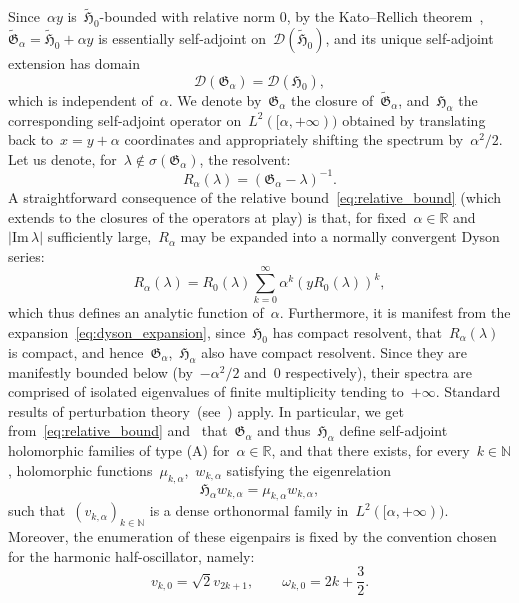 \documentclass[10pt]{article}
\newcommand{\R}{\mathbb{R}}
\newcommand{\N}{\mathbb N}
\newcommand{\1}{\mathbbm 1}
\begin{document}
    Since~$\alpha y$ is~$\widetilde{\mathfrak H}_0$-bounded with relative norm 0, by the Kato--Rellich theorem~\cite[Theorem 6.4]{T14},~$\widetilde{\mathfrak{G}}_\alpha=\widetilde{\mathfrak H}_0 + \alpha y$ is essentially self-adjoint on~$\mathcal D({\widetilde{\mathfrak{H}}}_0)$, and its unique self-adjoint extension has domain
    \[\mathcal D(\mathfrak{G}_\alpha) = \mathcal D({\mathfrak{H}_0}),\]
    which is independent of~$\alpha$.
    We denote by~$\mathfrak{G}_\alpha$ the closure of~${\widetilde{\mathfrak{G}}}_\alpha$, and~$\mathfrak{H}_\alpha$ the corresponding self-adjoint operator on~$L^2([\alpha,+\infty))$ obtained by translating back to~$x=y+\alpha$ coordinates and appropriately shifting the spectrum by~$\alpha^2/2$.
    Let us denote, for~$\lambda\not\in \sigma\left(\mathfrak{G}_\alpha\right)$, the resolvent:
    \[R_{\alpha}(\lambda) = \left(\mathfrak{G}_\alpha-\lambda\right)^{-1}.\]
    A straightforward consequence of the relative bound~\eqref{eq:relative_bound} (which extends to the closures of the operators at play) is that, for fixed~$\alpha\in \R$ and~$|\mathrm{Im}\,\lambda|$ sufficiently large,~$R_{\alpha}$ may be expanded into a normally convergent Dyson series:
    \begin{equation}
        \label{eq:dyson_expansion}
       R_{\alpha}(\lambda) = R_0(\lambda)\sum_{k=0}^\infty \alpha^k \left(y R_0(\lambda)\right)^k,
    \end{equation}
    which thus defines an analytic function of~$\alpha$. Furthermore, it is manifest from the expansion~\eqref{eq:dyson_expansion}, since~${\mathfrak H}_0$ has compact resolvent, that~$R_\alpha(\lambda)$ is compact, and hence~${\mathfrak G}_\alpha$,~${\mathfrak H}_\alpha$ also have compact resolvent. Since they are manifestly bounded below (by~$-\alpha^2/2$ and~$0$ respectively), their spectra are comprised of isolated eigenvalues of finite multiplicity tending to~$+\infty$.
    Standard results of perturbation theory~(see~\cite[Chapter 7]{K95}) apply. In particular, we get from~\eqref{eq:relative_bound} and~\cite[Theorem 2.6,Theorem 3.9]{K95} that~${\mathfrak G}_\alpha$ and thus~${\mathfrak H}_\alpha$ define self-adjoint holomorphic families of type (A) for~$\alpha\in\R$, and that there exists, for every~$k\in\N$, holomorphic functions~$\mu_{k,\alpha}$,~$w_{k,\alpha}$ satisfying the eigenrelation
    \begin{equation}
        \label{eq:holomorphic_eigensytem}
        {\mathfrak{H}}_\alpha w_{k,\alpha} = \mu_{k,\alpha} w_{k,\alpha},
    \end{equation}
    such that~$(v_{k,\alpha})_{k\in \N}$ is a dense orthonormal family in~$L^2([\alpha,+\infty))$. Moreover, the enumeration of these eigenpairs is fixed by the convention chosen for the harmonic half-oscillator, namely:
    \[v_{k,0} = \sqrt 2 v_{2k+1},\qquad \omega_{k,0} = 2k + \frac32.\]
\end{document}
